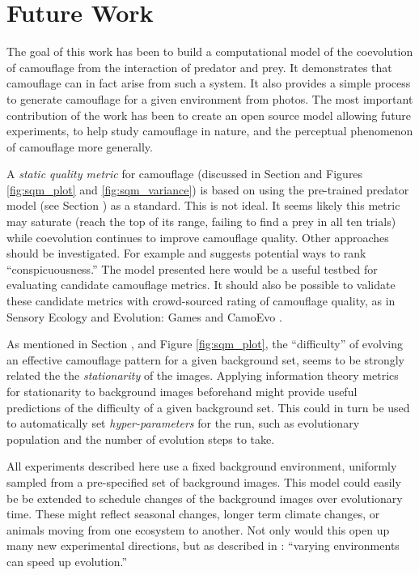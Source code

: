 \documentclass[letterpaper]{article}
\newcommand{\jargon}[1]{\textit{#1}}
\begin{document}
\section{Future Work}
The goal of this work has been to build a computational model of the coevolution of camouflage from the interaction of predator and prey. It demonstrates that camouflage can in fact arise from such a system. It also provides a simple process to generate camouflage for a given environment from photos. The most important contribution of the work has been to create an open source model allowing future experiments, to help study camouflage in nature, and the perceptual phenomenon of camouflage more generally.
\par
A \jargon{static quality metric} for camouflage (discussed in Section  and Figures \ref{fig:sqm_plot} and \ref{fig:sqm_variance}) is based on using the pre-trained predator model (see Section ) as a standard. This is not ideal. It seems likely this metric may saturate (reach the top of its range, failing to find a prey in all ten trials) while coevolution continues to improve camouflage quality. Other approaches should be investigated. For example \citet{lv_cod_2022} and \citet{volonakis_camouflage_2018} suggests potential ways to rank “conspicuousness.” The model presented here would be a useful testbed for evaluating candidate camouflage metrics. It should also be possible to validate these candidate metrics with crowd-sourced rating of camouflage quality, as in Sensory Ecology and Evolution: Games \citep{stevens_games_2022} and CamoEvo \citep{hancock_camoevo_2022}.
\par
As mentioned in Section , and Figure \ref{fig:sqm_plot}, the “difficulty” of evolving an effective camouflage pattern for a given background set, seems to be strongly related the the \jargon{stationarity} of the images. Applying information theory metrics for stationarity \citep{conni_visual_2021} to background images beforehand might provide useful predictions of the difficulty of a given background set. This could in turn be used to automatically set \jargon{hyper-parameters} for the run, such as evolutionary population and the number of evolution steps to take.
\par
All experiments described here use a fixed background environment, uniformly sampled from a pre-specified set of background images. This model could easily be be extended to schedule changes of the background images over evolutionary time. These might reflect seasonal changes, longer term climate changes, or animals moving from one ecosystem to another. Not only would this open up many new experimental directions, but as described in \citet{kashtan_varying_2007}: “varying environments can speed up evolution.”
\end{document}
